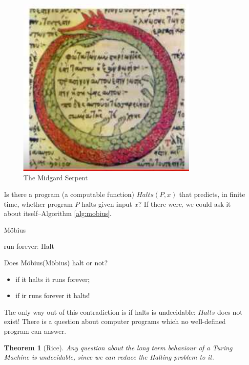 \documentclass[]{article}
\newtheorem{thm}{Theorem}
\begin{document}
\begin{figure}[H]
	\begin{center}
		\caption{The Midgard Serpent}\label{fig:midgard-serpent}
		\includegraphics[width=0.8\textwidth]{midgard-serpent}
	\end{center}
\end{figure}
Is there a program (a computable function) $Halts(P,x)$ that predicts, in finite time, whether program $P$ halts given input $x$? If there were, we could ask it about itself--Algorithm \ref{alg:mobius}.

\begin{algorithm}[H]
	\caption{M\"obius}
	  {run forever:}
	 {Halt}\label{alg:mobius}
\end{algorithm} 

Does M\"obius(M\"obius) halt or not?
\begin{itemize}
	\item if it halts it runs forever;
	\item if ir runs forever it halts!
\end{itemize}

The only way out of this contradiction is if halts is undecidable: $Halts$ does not exist! There is a question about computer programs which no well-defined program can answer.

\begin{thm}[Rice]
	Any question about the long term behaviour of a Turing Machine is undecidable, since we can reduce the Halting problem to it.
\end{thm}
\end{document}
